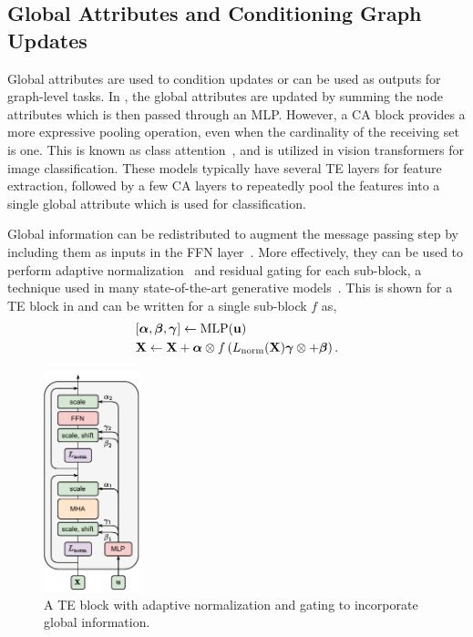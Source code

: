 \subsection{Global Attributes and Conditioning Graph Updates}
\label{sec:global_attributes}

Global attributes are used to condition updates or can be used as outputs for graph-level tasks.
In , the global attributes are updated by summing the node attributes which is then passed through an MLP\@.
However, a CA block provides a more expressive pooling operation, even when the cardinality of the receiving set is one.
This is known as class attention~\cite{GoingDeeper}, and is utilized in vision transformers for image classification.
These models typically have several TE layers for feature extraction, followed by a few CA layers to repeatedly pool the features into a single global attribute which is used for classification.

Global information can be redistributed to augment the message passing step by including them as inputs in the FFN layer~\cite{PCJeDiDiffusionParticle}.
More effectively, they can be used to perform adaptive normalization~\cite{FiLMVisualReasoning} and residual gating for each sub-block, a technique used in many state-of-the-art generative models~\cite{SD3, DIT, flux2024github}.
This is shown for a TE block in  and can be written for a single sub-block $f$ as,
\begin{equation}
    \begin{aligned}
    & [\boldsymbol{\alpha}, \boldsymbol{\beta}, \boldsymbol{\gamma}] \leftarrow \text{MLP}(\mathbf{u}) \\
    & \mathbf{X} \leftarrow \mathbf{X} + \boldsymbol{\alpha} \otimes f \left(L_\text{norm}(\mathbf{X})\boldsymbol{\gamma} \otimes  + \boldsymbol{\beta}\right).
    \end{aligned}
\end{equation}

\begin{figure}
    \centering
    \includegraphics[width=0.25\textwidth]{Figures/transformers/adaptivegating.pdf}
    \caption{A TE block with adaptive normalization and gating to incorporate global information.}
    \label{fig:adaptive_gating}
\end{figure}
